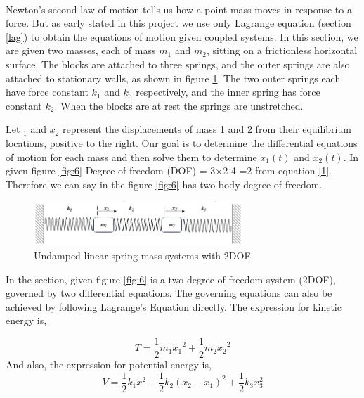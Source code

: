 \paragraph{}
Newton’s second law of motion tells us how a point mass moves in response to a force. But as early stated in this project we use only Lagrange equation (section \ref{lag}) to obtain the equations of motion given coupled systems. In this section, we are given two masses, each of mass $m_1$ and $m_2$, sitting on a frictionless horizontal surface.  The blocks are attached to three springs, and the outer springs are also attached to stationary walls, as shown in figure \ref{fig:7}. The two outer springs each have force constant $k_1$ and $k_3$ respectively, and the inner spring has force constant $k_2$. When the blocks are at rest the springs are unstretched.

Let $_1$ and $x_2$ represent the displacements of mass 1 and 2 from their equilibrium locations, positive to the right. Our goal is to determine the differential equations of motion for each mass and then solve them to determine $x_1(t)$ and $x_2 (t)$. In given figure \ref{fig:6} Degree of freedom (DOF) = 3$\times$2-4 =2 from equation \eqref{1}. Therefore we can say in the figure \ref{fig:6} has two body degree of freedom.



 \begin{figure}[hbt!]
	\centering
	\begin{framed}
	\includegraphics[width=0.7\textwidth]{Figures/G.png}
		\end{framed}
	\caption{ Undamped linear spring mass systems with 2DOF.}
	\label{fig:7}
\end{figure}

In the section, given figure \ref{fig:6} is a two degree of freedom system (2DOF), governed by two differential equations. The governing equations can also be achieved by following Lagrange's Equation directly. The expression for kinetic energy is,

\begin{equation}
    T = \frac{1}{2}m_1\dot{x_1}^2 + \frac{1}{2}m_2\dot{x_2}^2
\end{equation}
And also, the expression for potential energy is,
\begin{equation}
    V = \frac{1}{2}k_1x^2+\frac{1}{2}k_2(x_2-x_1)^2+\frac{1}{2}k_3x_3^2
\end{equation}

